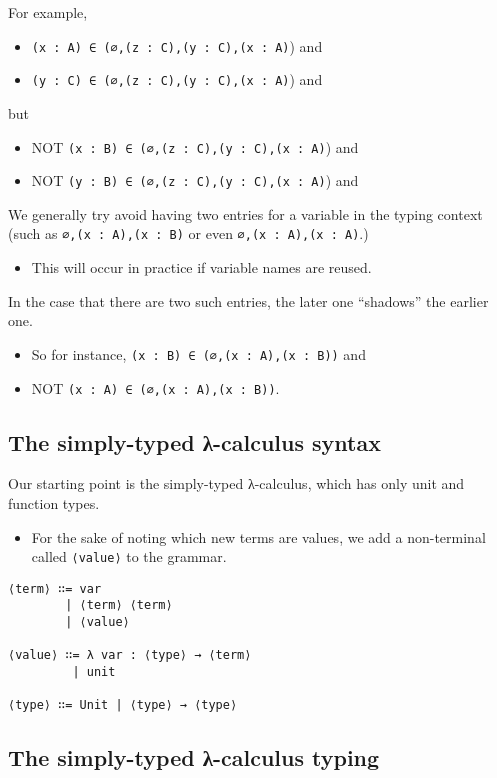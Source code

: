 \documentclass[11pt]{article}
\theoremstyle{definition}
\begin{document}
For example,
\begin{itemize}
\item \texttt{(x : A) ∈ (∅,(z : C),(y : C),(x : A)}) and
\item \texttt{(y : C) ∈ (∅,(z : C),(y : C),(x : A)}) and
\end{itemize}
but
\begin{itemize}
\item NOT \texttt{(x : B) ∈ (∅,(z : C),(y : C),(x : A)}) and
\item NOT \texttt{(y : B) ∈ (∅,(z : C),(y : C),(x : A)}) and
\end{itemize}

We generally try avoid having two entries for a variable in the typing context
(such as \texttt{∅,(x : A),(x : B)} or even \texttt{∅,(x : A),(x : A)}.)
\begin{itemize}
\item This will occur in practice if variable names are reused.
\end{itemize}
In the case that there are two such entries, the later one
“shadows” the earlier one.
\begin{itemize}
\item So for instance, \texttt{(x : B) ∈ (∅,(x : A),(x : B))} and
\item NOT \texttt{(x : A) ∈ (∅,(x : A),(x : B))}.
\end{itemize}

\subsection{The simply-typed λ-calculus syntax}
\label{sec:orgc61c562}

Our starting point is the simply-typed λ-calculus,
which has only unit and function types.
\begin{itemize}
\item For the sake of noting which new terms are values,
we add a non-terminal called \texttt{⟨value⟩} to the grammar.
\end{itemize}
\begin{verbatim}
⟨term⟩ ∷= var
        | ⟨term⟩ ⟨term⟩
        | ⟨value⟩
        
⟨value⟩ ∷= λ var : ⟨type⟩ → ⟨term⟩
         | unit
         
⟨type⟩ ∷= Unit | ⟨type⟩ → ⟨type⟩
\end{verbatim}

\subsection{The simply-typed λ-calculus typing}
\label{sec:org3f46aab}
\end{document}
